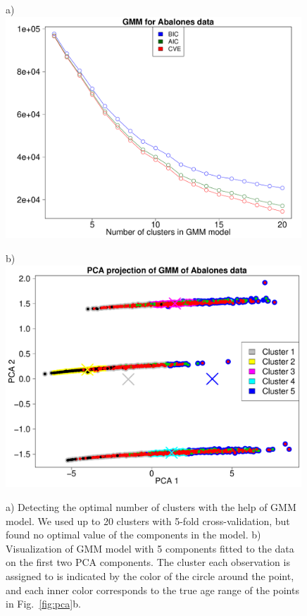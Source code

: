 \documentclass[10pt, paper=a4]{article}
\begin{document}
\begin{figure}[h!]
  \begin{minipage}{0.49\textwidth}
    a)\\
    \includegraphics[width = 0.99\textwidth]{GMMCV1.pdf}
  \end{minipage} \hfill
  \begin{minipage}{0.49\textwidth}
    b)\\
    \includegraphics[width = 0.99\textwidth]{GMM_data.pdf}
  \end{minipage} \vfill
  \caption{a) Detecting the optimal number of clusters with the help of GMM
    model.  We used up to 20 clusters with 5-fold cross-validation, but found no
    optimal value of the components in the model.  b) Visualization of GMM model
    with 5 components fitted to the data on the first two PCA components.  The
    cluster each observation is assigned to is indicated by the color of the
    circle around the point, and each inner color corresponds to the true age
    range of the points in Fig.~\ref{fig:pca}b.}
  \label{fig:gmm}
\end{figure}
\end{document}
